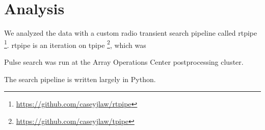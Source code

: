 \section{Analysis}

We analyzed the data with a custom radio transient search pipeline called rtpipe \footnote{\url{https://github.com/caseyjlaw/rtpipe}}. rtpipe is an iteration on tpipe \footnote{\url{https://github.com/caseyjlaw/tpipe}}, which was


Pulse search was run at the Array Operations Center postprocessing cluster.
 

The search pipeline is written largely in Python.
